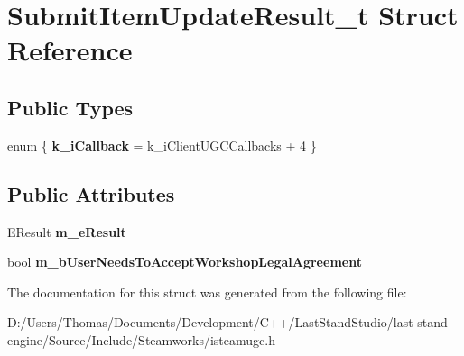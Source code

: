\hypertarget{structSubmitItemUpdateResult__t}{}\section{Submit\+Item\+Update\+Result\+\_\+t Struct Reference}
\label{structSubmitItemUpdateResult__t}
\subsection*{Public Types}
\begin{DoxyCompactItemize}
\item 
\hypertarget{structSubmitItemUpdateResult__t_a55518adc9b6ff6f49556ef90643d1876}{}enum \{ {\bfseries k\+\_\+i\+Callback} = k\+\_\+i\+Client\+U\+G\+C\+Callbacks + 4
 \}\label{structSubmitItemUpdateResult__t_a55518adc9b6ff6f49556ef90643d1876}

\end{DoxyCompactItemize}
\subsection*{Public Attributes}
\begin{DoxyCompactItemize}
\item 
\hypertarget{structSubmitItemUpdateResult__t_afc97b6791310f59808be81c10fe3cabd}{}E\+Result {\bfseries m\+\_\+e\+Result}\label{structSubmitItemUpdateResult__t_afc97b6791310f59808be81c10fe3cabd}

\item 
\hypertarget{structSubmitItemUpdateResult__t_a610c8809e2d2c0a6a4f8450a8c4ffc95}{}bool {\bfseries m\+\_\+b\+User\+Needs\+To\+Accept\+Workshop\+Legal\+Agreement}\label{structSubmitItemUpdateResult__t_a610c8809e2d2c0a6a4f8450a8c4ffc95}

\end{DoxyCompactItemize}


The documentation for this struct was generated from the following file\+:\begin{DoxyCompactItemize}
\item 
D\+:/\+Users/\+Thomas/\+Documents/\+Development/\+C++/\+Last\+Stand\+Studio/last-\/stand-\/engine/\+Source/\+Include/\+Steamworks/isteamugc.\+h\end{DoxyCompactItemize}
